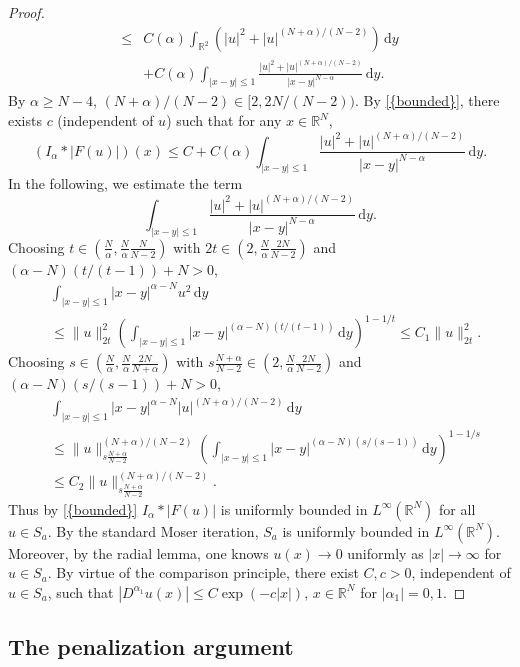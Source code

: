 \documentclass[12pt,reqno]{amsart}
\numberwithin{equation}{section}
\begin{document}
\begin{proof}
{\begin{align*}
\le& C({\alpha})\int_{{\mathbb R}^2}(|u|^2+|u|^{(N+{\alpha})/(N-2)})\,{\mathrm{d}} y\\
\, &+C({\alpha})\int_{|x-y|\le1}\frac{|u|^2+|u|^{(N+{\alpha})/(N-2)}}{|x-y|^{N-{\alpha}}}\,{\mathrm{d}} y.
\end{align*}}By ${\alpha}\ge N-4$, $(N+{\alpha})/(N-2)\in[2,2N/(N-2))$. By {\eqref{{bounded}}}, there exists $c$ (independent of $u$) such that for any $x\in{\mathbb R^N}$,
$$
(I_{\alpha}\ast |F(u)|)(x)\le C+C({\alpha})\int_{|x-y|\le1}\frac{|u|^2+|u|^{(N+{\alpha})/(N-2)}}{|x-y|^{N-{\alpha}}}\,{\mathrm{d}} y.
$$
In the following, we estimate the term
$$
\int_{|x-y|\le1}\frac{|u|^2+|u|^{(N+{\alpha})/(N-2)}}{|x-y|^{N-{\alpha}}}\,{\mathrm{d}} y.
$$
Choosing $t\in(\frac{N}{\alpha},\frac{N}{\alpha}\frac{N}{N-2})$ with $2t\in(2,\frac{N}{\alpha}\frac{2N}{N-2})$ and $({\alpha}-N)(t/(t-1))+N>0$,
\begin{align*}
&\int_{|x-y|\le1}|x-y|^{{\alpha}-N}u^2\,{\mathrm{d}} y\\
&\le\|u\|_{2t}^2\left(\int_{|x-y|\le1}|x-y|^{({\alpha}-N)(t/(t-1))}\,{\mathrm{d}} y\right)^{1-1/t}\le C_1\|u\|_{2t}^2.
\end{align*}
Choosing $s\in(\frac{N}{\alpha},\frac{N}{\alpha}\frac{2N}{N+{\alpha}})$ with $s\frac{N+{\alpha}}{N-2}\in(2,\frac{N}{\alpha}\frac{2N}{N-2})$ and $({\alpha}-N)(s/(s-1))+N>0$,
\begin{align*}
&\int_{|x-y|\le1}|x-y|^{{\alpha}-N}|u|^{(N+{\alpha})/(N-2)}\,{\mathrm{d}} y\\
&\le\|u\|_{s\frac{N+{\alpha}}{N-2}}^{(N+{\alpha})/(N-2)}\left(\int_{|x-y|\le1}|x-y|^{({\alpha}-N)(s/(s-1))}\,{\mathrm{d}} y\right)^{1-1/s}\\
&\le C_2\|u\|_{s\frac{N+{\alpha}}{N-2}}^{(N+{\alpha})/(N-2)}.
\end{align*}
Thus by {\eqref{{bounded}}} $I_{\alpha}\ast |F(u)|$ is uniformly bounded in $L^{\infty}({\mathbb R^N})$ for all $u\in S_a$. By the standard Moser iteration, $S_a$ is uniformly bounded in $L^{\infty}({\mathbb R^N})$. Moreover, by the radial lemma, one knows $u(x){\rightarrow}0$ uniformly as $|x|{\rightarrow}{\infty}$ for $u\in S_a$. By virtue of the comparison principle, there exist $C,c>0$, independent of $u\in S_a$, such that $|D^{{\alpha}_1}u(x)|\le C\exp(-c|x|), \,x\in {\mathbb R^N}$ for $|{\alpha}_1|=0,1$.

\end{proof}

\subsection{The penalization argument}
\end{document}
